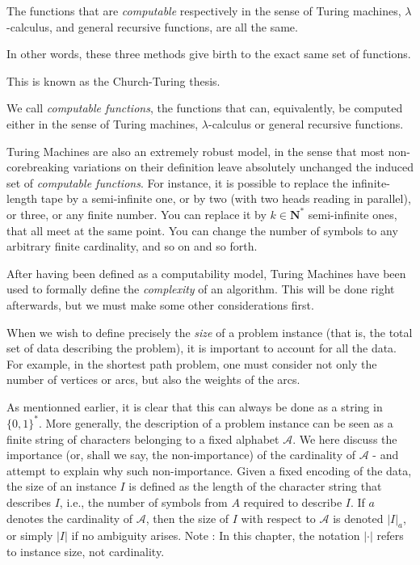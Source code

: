 \begin{theorem}
    The functions that are \textit{computable} respectively in the sense of Turing machines, $ \lambda $-calculus, and general recursive functions, are all the same. 
    
    In other words, these three methods give birth to the exact same set of functions. 
\end{theorem}

This is known as the Church-Turing thesis.

\begin{definition}
    We call \textit{computable functions}, the functions that can, equivalently, be computed either in the sense of Turing machines, $ \lambda $-calculus or general recursive functions.
\end{definition}

Turing Machines are also an extremely robust model, in the sense that most non-corebreaking variations on their definition leave absolutely unchanged the induced set of \textit{computable functions}. For instance, it is possible to replace the infinite-length tape by a semi-infinite one, or by two (with two heads reading in parallel), or three, or any finite number. You can replace it by $k \in \mathbf N^*$ semi-infinite ones, that all meet at the same point. You can change the number of symbols to any arbitrary finite cardinality, and so on and so forth.

After having been defined as a computability model, Turing Machines have been used to formally define the \textit{complexity} of an algorithm. This will be done right afterwards, but we must make some other considerations first.

When we wish to define precisely the \emph{size} of a problem instance (that is, the total set of data describing the problem), it is important to account for all the data. For example, in the shortest path problem, one must consider not only the number of vertices or arcs, but also the weights of the arcs.

As mentionned earlier, it is clear that this can always be done as a string in $ \{0,1\}^* $. More generally, the description of a problem instance can be seen as a finite string of characters belonging to a fixed alphabet \( \mathcal A \). We here discuss the importance (or, shall we say, the non-importance) of the cardinality of \( \mathcal A \) - and attempt to explain why such non-importance. Given a fixed encoding of the data, the size of an instance \( I \) is defined as the length of the character string that describes \( I \), i.e., the number of symbols from \( A \) required to describe \( I \). If \( a \) denotes the cardinality of \( \mathcal A \), then the size of \( I \) with respect to \( \mathcal A \) is denoted \( |I|_a \), or simply \( |I| \) if no ambiguity arises. Note : In this chapter, the notation \( |\cdot| \) refers to instance size, not cardinality.

